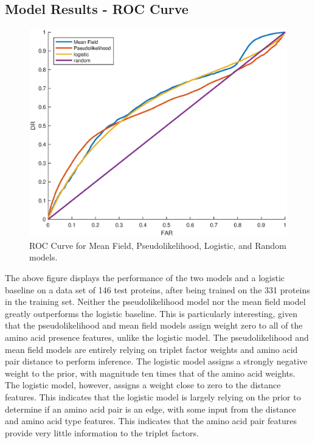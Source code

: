 \documentclass{article}
\begin{document}
\subsection{Model Results - ROC Curve}

\begin{figure}[H]
\centering
\includegraphics[scale=0.7]{paper_images/roc_curve.eps}
\caption{ROC Curve for Mean Field, Pseudolikelihood, Logistic, and Random models.}
\label{fig:roc}
\end{figure}

The above figure displays the performance of the two models and a logistic baseline on a data set of 146 test proteins, after being trained on the 331 proteins in the training set. Neither the pseudolikelihood model nor the mean field model greatly outperforms the logistic baseline. This is particularly interesting, given that the pseudolikelihood and mean field models assign weight zero to all of the amino acid presence features, unlike the logistic model. The pseudolikelihood and mean field models are entirely relying on triplet factor weights and amino acid pair distance to perform inference. The logistic model assigns a strongly negative weight to the prior, with magnitude ten times that of the amino acid weights. The logistic model, however, assigns a weight close to zero to the distance features. This indicates that the logistic model is largely relying on the prior to determine if an amino acid pair is an edge, with some input from the distance and amino acid type features. This indicates that the amino acid pair features provide very little information to the triplet factors. 
\end{document}
